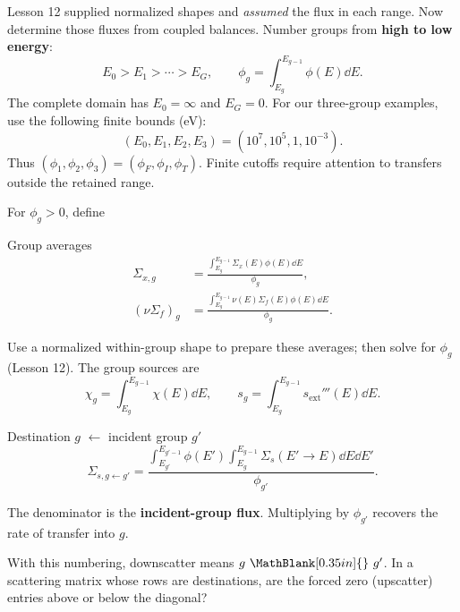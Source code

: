 \begin{handoutcolumns}
Lesson 12 supplied normalized shapes and \emph{assumed} the
flux in each range. Now determine those fluxes from coupled balances.
Number groups from \textbf{high to low energy}:
\[
 E_0>E_1>\cdots>E_G,
 \qquad \phi_g=\int_{E_g}^{E_{g-1}}\phi(E)\dd E.
\]
The complete domain has $E_0=\infty$ and $E_G=0$.
For our three-group examples, use the following finite bounds (eV):
\[
 (E_0,E_1,E_2,E_3)=(10^7,10^5,1,10^{-3}).
\]
Thus $(\phi_1,\phi_2,\phi_3)=(\phi_F,\phi_I,\phi_T)$.
Finite cutoffs require attention to transfers outside the retained range.

For $\phi_g>0$, define
\begin{fixedbox}{Group averages}
\begin{align*}
 \Sigma_{x,g}&=
 \frac{\int_{E_g}^{E_{g-1}}\Sigma_x(E)\phi(E)\dd E}{\phi_g},\\
 (\nu\Sigma_f)_g&=
 \frac{\int_{E_g}^{E_{g-1}}\nu(E)\Sigma_f(E)\phi(E)\dd E}{\phi_g}.
\end{align*}
\end{fixedbox}
Use a normalized within-group shape to prepare these averages;
then solve for $\phi_g$ (Lesson 12). The group sources are
\[
 \chi_g=\int_{E_g}^{E_{g-1}}\chi(E)\dd E,
 \qquad s_g=\int_{E_g}^{E_{g-1}}s_{\mathrm{ext}}'''(E)\dd E.
\]

\begin{fixedbox}{Destination $g$ $\gets$ incident group $g'$}
\[
 \Sigma_{s,g\gets g'}=
 \frac{\displaystyle
 \int_{E_{g'}}^{E_{g'-1}}\!\phi(E')
 \int_{E_g}^{E_{g-1}}\!\Sigma_s(E'\!\to E)\dd E\dd E'}
 {\phi_{g'}}.
\]
\end{fixedbox}
The denominator is the \textbf{incident-group flux}.
Multiplying by $\phi_{g'}$ recovers the rate of transfer into $g$.
\begin{checkpoint}
With this numbering, downscatter means
$g\ \MathBlank[0.35in]{}\ g'$. In a scattering matrix whose
rows are destinations, are the forced zero (upscatter) entries
above or below the diagonal?
\end{checkpoint}


\end{handoutcolumns}

